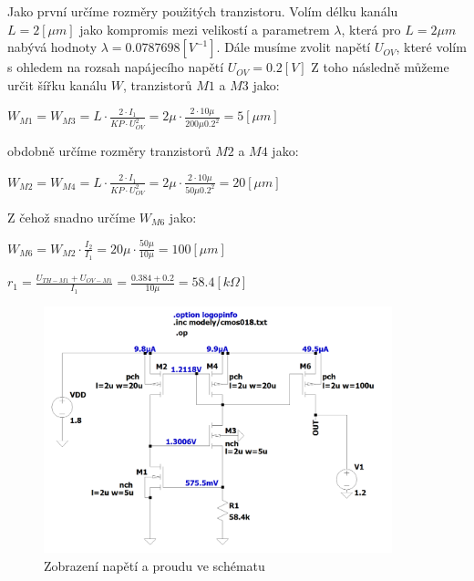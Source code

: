 Jako první určíme rozměry použitých tranzistoru.
Volím délku kanálu \(L = 2 [\mu m]\) jako kompromis mezi velikostí a parametrem \(\lambda\), která pro \(L = 2 \mu m\) nabývá hodnoty \(\lambda = 0.0787698 [V^{-1}]\).
Dále musíme zvolit napětí \(U_{OV}\), které volím s ohledem na rozsah napájecího napětí \(U_{OV} = 0.2 [V]\)
Z toho následně můžeme určit šířku kanálu \(W\), tranzistorů \(M1\) a \(M3\) jako:

\begin{center}
    \large
    \(
        W_{M1} = W_{M3} = L \cdot \frac{2 \cdot I_1}{KP \cdot U_{OV}^2} = 2\mu \cdot \frac{2 \cdot 10\mu}{200\mu 0.2^2} = 5 [\mu m]
    \)
\end{center}

obdobně určíme rozměry tranzistorů \(M2\) a \(M4\) jako:

\begin{center}
    \large
    \(
        W_{M2} = W_{M4} = L \cdot \frac{2 \cdot I_1}{KP \cdot U_{OV}^2} = 2\mu \cdot \frac{2 \cdot 10\mu}{50\mu 0.2^2} = 20 [\mu m]
    \)
\end{center}

Z čehož snadno určíme \(W_{M6}\) jako:

\begin{center}
    \large
    \(
        W_{M6} = W_{M2} \cdot \frac{I_2}{I_1} = 20\mu \cdot \frac{50\mu}{10\mu} = 100 [\mu m]
    \)
\end{center}

\begin{center}
    \large
    \(
        r_1 = \frac{U_{TH-M1}+U_{OV-M1}}{I_1} = \frac{0.384+0.2}{10\mu} = 58.4 [k\Omega] 
    \)
\end{center}

\vspace{10mm}
\begin{figure}[h!]
    \centering
    \includegraphics[width=0.9\textwidth]{text/img/PR-op-sch.png}
    \caption{\label{fig:KPZ-op-sch} Zobrazení napětí a proudu ve schématu}
\end{figure}

